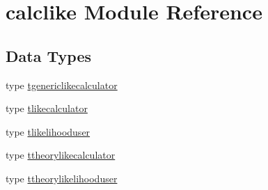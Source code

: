 \hypertarget{namespacecalclike}{}\section{calclike Module Reference}
\label{namespacecalclike}
\subsection*{Data Types}
\begin{DoxyCompactItemize}
\item 
type \mbox{\hyperlink{structcalclike_1_1tgenericlikecalculator}{tgenericlikecalculator}}
\item 
type \mbox{\hyperlink{structcalclike_1_1tlikecalculator}{tlikecalculator}}
\item 
type \mbox{\hyperlink{structcalclike_1_1tlikelihooduser}{tlikelihooduser}}
\item 
type \mbox{\hyperlink{structcalclike_1_1ttheorylikecalculator}{ttheorylikecalculator}}
\item 
type \mbox{\hyperlink{structcalclike_1_1ttheorylikelihooduser}{ttheorylikelihooduser}}
\end{DoxyCompactItemize}
